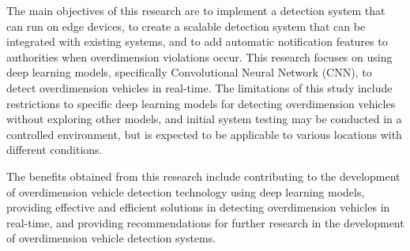 The main objectives of this research are to implement a detection system that can run on edge devices, to create a scalable detection system that can be integrated with existing systems, and to add automatic notification features to authorities when overdimension violations occur. This research focuses on using deep learning models, specifically Convolutional Neural Network (CNN), to detect overdimension vehicles in real-time. The limitations of this study include restrictions to specific deep learning models for detecting overdimension vehicles without exploring other models, and initial system testing may be conducted in a controlled environment, but is expected to be applicable to various locations with different conditions.

The benefits obtained from this research include contributing to the development of overdimension vehicle detection technology using deep learning models, providing effective and efficient solutions in detecting overdimension vehicles in real-time, and providing recommendations for further research in the development of overdimension vehicle detection systems.